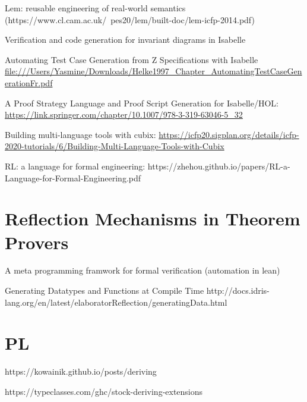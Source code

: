 Lem: reusable engineering of real-world semantics (https://www.cl.cam.ac.uk/~pes20/lem/built-doc/lem-icfp-2014.pdf)

Verification and code generation for invariant diagrams in Isabelle

Automating Test Case Generation from Z Specifications with Isabelle
\url{file:///Users/Yasmine/Downloads/Helke1997_Chapter_AutomatingTestCaseGenerationFr.pdf}

A Proof Strategy Language and Proof Script Generation for Isabelle/HOL: 
\url{https://link.springer.com/chapter/10.1007/978-3-319-63046-5_32}

Building multi-language tools with cubix: \url{https://icfp20.sigplan.org/details/icfp-2020-tutorials/6/Building-Multi-Language-Tools-with-Cubix} 

RL: a language for formal engineering: https://zhehou.github.io/papers/RL-a-Language-for-Formal-Engineering.pdf 


\section{Reflection Mechanisms in Theorem Provers}
\label{sec:reflectionTPs}
A meta programming framwork for formal verification (automation in lean)

Generating Datatypes and Functions at Compile Time
http://docs.idris-lang.org/en/latest/elaboratorReflection/generatingData.html

\section{PL}
https://kowainik.github.io/posts/deriving

https://typeclasses.com/ghc/stock-deriving-extensions

